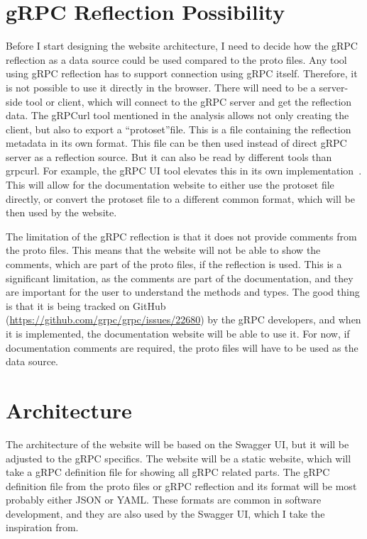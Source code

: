\section{gRPC Reflection Possibility}
Before I start designing the website architecture, I need to decide how the gRPC reflection as a data source could be used compared to the proto files.
Any tool using gRPC reflection has to support connection using gRPC itself.
Therefore, it is not possible to use it directly in the browser.
There will need to be a server-side tool or client, which will connect to the gRPC server and get the reflection data.
The gRPCurl tool mentioned in the analysis allows not only creating the client, but also to export a \enquote{protoset}file.
This is a file containing the reflection metadata in its own format.
This file can be then used instead of direct gRPC server as a reflection source.
But it can also be read by different tools than grpcurl.
For example, the gRPC UI tool elevates this in its own implementation~\cite{grpc-grpcui}.
This will allow for the documentation website to either use the protoset file directly, or convert the protoset file to a different common format, which will be then used by the website.

The limitation of the gRPC reflection is that it does not provide comments from the proto files.
This means that the website will not be able to show the comments, which are part of the proto files, if the reflection is used.
This is a significant limitation, as the comments are part of the documentation, and they are important for the user to understand the methods and types.
The good thing is that it is being tracked on GitHub (\url{https://github.com/grpc/grpc/issues/22680}) by the gRPC developers, and when it is implemented, the documentation website will be able to use it.
For now, if documentation comments are required, the proto files will have to be used as the data source.


\section{Architecture}
The architecture of the website will be based on the Swagger UI, but it will be adjusted to the gRPC specifics.
The website will be a static website, which will take a gRPC definition file for showing all gRPC related parts.
The gRPC definition file from the proto files or gRPC reflection and its format will be most probably either JSON or YAML\@.
These formats are common in software development, and they are also used by the Swagger UI, which I take the inspiration from.

